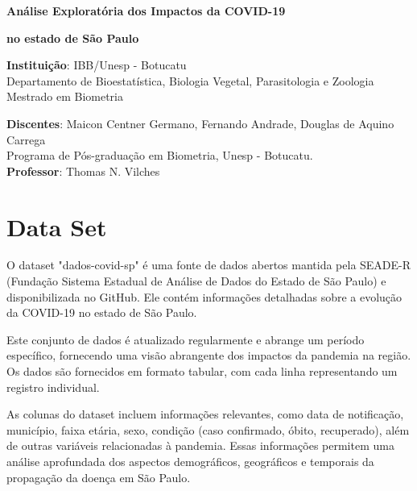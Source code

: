 \documentclass[12pt, 
oneside,		  
a4paper,			
english,			
brazil				 
]{article}
\begin{document}
\thispagestyle{empty}

\centerline{\Large \bf Análise Exploratória dos Impactos da COVID-19}

\centerline{\Large \bf
no estado de São Paulo}
\smallskip



\begin{center}
\bigskip\bigskip\bigskip\bigskip\bigskip\bigskip
{\large{\bf Instituição}: IBB/Unesp - Botucatu}\\

{\large Departamento de Bioestatística, Biologia Vegetal, Parasitologia e Zoologia}  \\[.1cm]
{\large Mestrado em Biometria}  \\[.1cm]
\end{center}
\bigskip\bigskip\bigskip\bigskip\bigskip\bigskip

\bigskip

\begin{center}
{{\bf Discentes}: Maicon Centner Germano, Fernando Andrade, Douglas de Aquino Carrega}\\[.1cm]
Programa de Pós-graduação em Biometria, Unesp - Botucatu.\\[.1cm]

{{\bf Professor}: Thomas N. Vilches}\\[.1cm]

\end{center}

\newpage

\bigskip\bigskip\bigskip

\section{Data Set}
O dataset "dados-covid-sp" é uma fonte de dados abertos mantida pela SEADE-R (Fundação Sistema Estadual de Análise de Dados do Estado de São Paulo) e disponibilizada no GitHub. Ele contém informações detalhadas sobre a evolução da COVID-19 no estado de São Paulo.

Este conjunto de dados é atualizado regularmente e abrange um período específico, fornecendo uma visão abrangente dos impactos da pandemia na região. Os dados são fornecidos em formato tabular, com cada linha representando um registro individual.

As colunas do dataset incluem informações relevantes, como data de notificação, município, faixa etária, sexo, condição (caso confirmado, óbito, recuperado), além de outras variáveis relacionadas à pandemia. Essas informações permitem uma análise aprofundada dos aspectos demográficos, geográficos e temporais da propagação da doença em São Paulo.
\end{document}
